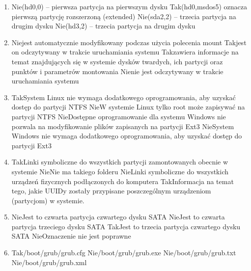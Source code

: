 \begin{enumerate}
	\newpage
	
	\item {}%
	{Nie}{(hd0,0) – pierwsza partycja na pierwszym dysku}%
	{Tak}{(hd0,msdos5) oznacza pierwszą partycję rozszerzoną (extended)}%
	{Nie}{(sda2,2) – trzecia partycja na drugim dysku}%
	{Nie}{(hd3,2) – trzecia partycja na drugim dysku}

	\item {}%
	{Nie}{jest automatycznie modyfikowany podczas użycia polecenia mount}%
	{Tak}{jest on odczytywany w trakcie uruchamiania systemu}%
	{Tak}{zawiera informacje na temat znajdujących się w systemie dysków twardych, ich partycji oraz punktów i parametrów montowania}%
	{Nie}{nie jest odczytywany w trakcie uruchamiania systemu}

	\item {}%
	{Tak}{System Linux nie wymaga dodatkowego oprogramowania, aby uzyskać dostęp do partycji NTFS}%
	{Nie}{W systemie Linux tylko root może zapisywać na partycji NTFS}%
	{Nie}{Dostępne oprogramowanie dla systemu Windows nie pozwala na modyfikowanie plików zapisanych na partycji Ext3}%
	{Nie}{System Windows nie wymaga dodatkowego oprogramowania, aby uzyskać dostęp do partycji Ext3}

	\item {}%
	{Tak}{Linki symboliczne do wszystkich partycji zamontowanych obecnie w systemie}%
	{Nie}{Nie ma takiego folderu}%
	{Nie}{Linki symboliczne do wszystkich urządzeń fizycznych podłączonych do komputera}%
	{Tak}{Informacja na temat tego, jakie UUIDy zostały przypisane poszczególnym urządzeniom (partycjom) w systemie.}

	\item {}%
	{Nie}{Jest to czwarta partycja czwartego dysku SATA}%
	{Nie}{Jest to czwarta partycja trzeciego dysku SATA}%
	{Tak}{Jest to trzecia partycja czwartego dysku SATA}%
	{Nie}{Oznaczenie nie jest poprawne}

	\item {}%
	{Tak}{/boot/grub/grub.cfg}%
	{Nie}{/boot/grub/grub.exe}%
	{Nie}{/boot/grub/grub.txt}%
	{Nie}{/boot/grub/grub.xml}


	
	
	
		
\end{enumerate}